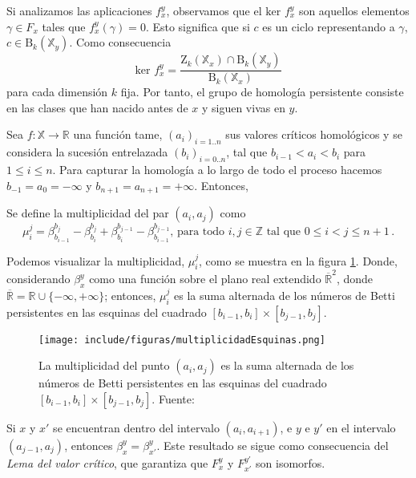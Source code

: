 \begin{remark}
Si analizamos las aplicaciones $f_{x}^{y}$, observamos que el $\text{ker } f_{x}^{y}$ son aquellos elementos $\gamma \in F_x$ tales que $f_{x}^{y}(\gamma)=0$. Esto significa que si $c$ es un ciclo representando a $\gamma$, $c \in \text{B}_k(\mathbb{X}_y)$. Como consecuencia
\[
\text{ker } f_{x}^{y} = \dfrac{\text{Z}_k(\mathbb{X}_x) \cap \text{B}_k(\mathbb{X}_y)}{\text{B}_k(\mathbb{X}_x)}
\]
para cada dimensión $k$ fija. Por tanto, el grupo de homología persistente consiste en las clases que han nacido antes de $x$ y siguen vivas en $y$.
\end{remark}

Sea $f: \mathbb{X} \to \mathbb{R}$ una función tame, $(a_i)_{i=1..n}$ sus valores críticos homológicos y se considera la sucesión entrelazada $(b_i)_{i=0..n}$, tal que $b_{i-1} < a_{i} < b_{i}$ para $1 \leq i \leq n$. Para capturar la homología a lo largo de todo el proceso hacemos $b_{-1} = a_0 = -\infty$ y $b_{n+1} = a_{n+1} = +\infty$. Entonces,
\begin{definition}
Se define la multiplicidad del par $(a_i, a_j)$ como
\[
\mu_{i}^{j} = \beta_{b_{i-1}}^{b_j} - \beta_{b_i}^{b_j} +  \beta_{b_i}^{b_{j-1}} - \beta_{b_{i-1}}^{b_{j-1}} \text{, para todo } i, j \in \mathbb{Z} \text{ tal que } 0 \leq i < j \leq n+1\,.
\]
\end{definition}

\begin{sloppypar}
Podemos visualizar la multiplicidad, $\mu_{i}^{j}$, como se muestra en la figura \ref{ref:multiplicidadDiagrama}. Donde, considerando $\beta_{x}^{y}$ como una función sobre el plano real extendido $\overline{\mathbb{R}}^2$, donde ${\overline{\mathbb{R}} = \mathbb{R} \cup \{-\infty, +\infty\}}$; entonces, $\mu_{i}^{j}$ es la suma alternada de los números de Betti persistentes en las esquinas del cuadrado $[b_{i-1}, b_i]\times[b_{j-1}, b_j]$.
\end{sloppypar}

\begin{figure}[!ht]
\centering
\texttt{[image: include/figuras/multiplicidadEsquinas.png]} 
\caption{La multiplicidad del punto $(a_i, a_j)$ es la suma alternada de los números de Betti persistentes en las esquinas del cuadrado $[b_{i-1}, b_i]\times[b_{j-1}, b_j]$. Fuente: \cite{Cohen-Steiner2007}}
\label{ref:multiplicidadDiagrama}
\end{figure}

\begin{remark}
Si $x$ y $x'$ se encuentran dentro del intervalo $(a_i, a_{i+1})$, e $y$ e $y'$ en el intervalo $(a_{j-1}, a_j)$, entonces $\beta_{x}^{y} = \beta_{x'}^{y}$. Este resultado se sigue como consecuencia del \emph{Lema del valor crítico}, que garantiza que $F_{x}^{y}$ y $F_{x'}^{y'}$ son isomorfos.
\end{remark}

